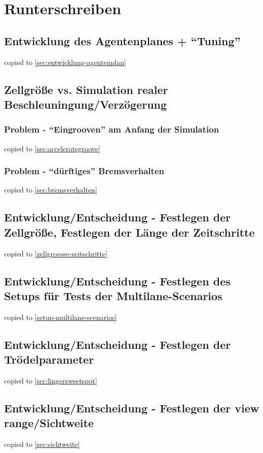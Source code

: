 \section{Runterschreiben}
\label{sec:rusch}




\subsection{Entwicklung des Agentenplanes + \enquote{Tuning}}
copied to \cref{sec:entwicklung-agentenplan}




\subsection{Zellgröße vs. Simulation realer Beschleuningung/Verzögerung}

\subsubsection{Problem - \enquote{Eingrooven} am Anfang der Simulation}
copied to \cref{sec:accelerategroove}


\subsubsection{Problem - \enquote{dürftiges} Bremsverhalten}
copied to \cref{sec:bremsverhalten}




\subsection{Entwicklung/Entscheidung - Festlegen der Zellgröße, Festlegen der Länge der Zeitschritte}
copied to \cref{zellgroesse-zeitschritte}


\subsection{Entwicklung/Entscheidung - Festlegen des Setups für Tests der Multilane-Scenarios}
copied to \cref{setup-multilane-scenarios}


\subsection{Entwicklung/Entscheidung - Festlegen der Trödelparameter}
copied to \cref{sec:lingersweetspot}


\subsection{Entwicklung/Entscheidung - Festlegen der view range/Sichtweite}
copied to \cref{sec:sichtweite}


